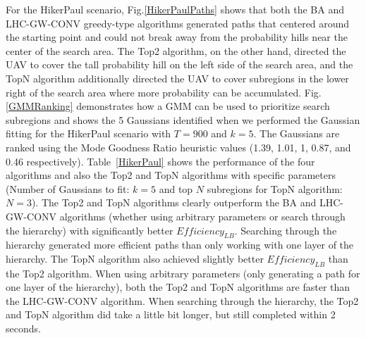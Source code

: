 \documentclass[journal]{IEEEtran}
\begin{document}
For the HikerPaul scenario, Fig.\ref{HikerPaulPaths} shows that both the BA and LHC-GW-CONV greedy-type algorithms generated paths that centered around the starting point and could not break away from the probability hills near the center of the search area. The Top2 algorithm, on the other hand, directed the UAV to cover the tall probability hill on the left side of the search area, and the TopN algorithm additionally directed the UAV to cover subregions in the lower right of the search area where more probability can be accumulated. Fig.\ref{GMMRanking} demonstrates how a GMM can be used to prioritize search subregions and shows the 5 Gaussians identified when we performed the Gaussian fitting for the HikerPaul scenario with $T=900$ and $k=5$. The Gaussians are ranked using the Mode Goodness Ratio heuristic values (1.39, 1.01, 1, 0.87, and 0.46 respectively). Table~\ref{HikerPaul} shows the performance of the four algorithms and also the Top2 and TopN algorithms with specific parameters (Number of Gaussians to fit: $k=5$ and top $N$ subregions for TopN algorithm: $N=3$). The Top2 and TopN algorithms clearly outperform the BA and LHC-GW-CONV algorithms (whether using arbitrary parameters or search through the hierarchy) with significantly better $\mathit{Efficiency_{LB}}$. Searching through the hierarchy generated more efficient paths than only working with one layer of the hierarchy. The TopN algorithm also achieved slightly better $\mathit{Efficiency_{LB}}$ than the Top2 algorithm. When using arbitrary parameters (only generating a path for one layer of the hierarchy), both the Top2 and TopN algorithms are faster than the LHC-GW-CONV algorithm. When searching through the hierarchy, the Top2 and TopN algorithm did take a little bit longer, but still completed within 2 seconds.

\end{document}
